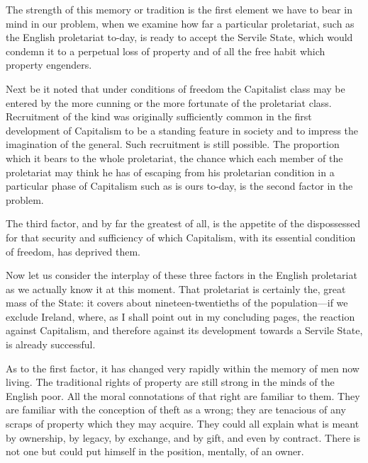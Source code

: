 \documentclass{book}
\begin{document}
The strength of this memory or tradition is the first element we have to bear in mind in our problem, when we examine how far a particular proletariat, such as the English proletariat to-day, is ready to accept the Servile State, which would condemn it to a perpetual loss of property and of all the free habit which property engenders.

Next be it noted that under conditions of freedom the Capitalist class may be entered by the more cunning or the more fortunate of the proletariat class. Recruitment of the kind was originally sufficiently common in the first development of Capitalism to be a standing feature in society and to impress the imagination of the general. Such recruitment is still possible. The proportion which it bears to the whole proletariat, the chance which each member of the proletariat may think he has of escaping from his proletarian condition in a particular phase of Capitalism such as is ours to-day, is the second factor in the problem.

The third factor, and by far the greatest of all, is the appetite of the dispossessed for that security and sufficiency of which Capitalism, with its essential condition of freedom, has deprived them.

Now let us consider the interplay of these three factors in the English proletariat as we actually know it at this moment. That proletariat is certainly the, great mass of the State: it covers about nineteen-twentieths of the population—if we exclude Ireland, where, as I shall point out in my concluding pages, the reaction against Capitalism, and therefore against its development towards a Servile State, is already successful.

As to the first factor, it has changed very rapidly within the memory of men now living. The traditional rights of property are still strong in the minds of the English poor. All the moral connotations of that right are familiar to them. They are familiar with the conception of theft as a wrong; they are tenacious of any scraps of property which they may acquire. They could all explain what is meant by ownership, by legacy, by exchange, and by gift, and even by contract. There is not one but could put himself in the position, mentally, of an owner.
\end{document}
